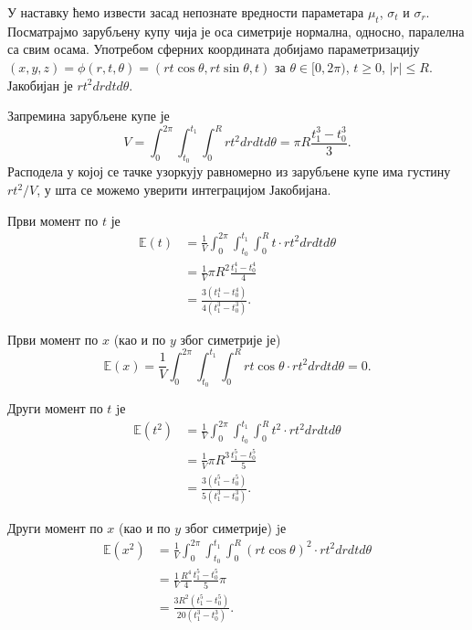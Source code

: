 \documentclass[12pt, a4paper, twoside]{book}
\numberwithin{equation}{chapter}
\numberwithin{theorem}{section}
\numberwithin{definition}{section}
\numberwithin{definitionChapter}{chapter}
\begin{document}
У наставку ћемо извести засад непознате вредности параметара $\mu_t$, $\sigma_t$ и $\sigma_r$.
Посматрајмо зарубљену купу чија је оса симетрије нормална, односно, паралелна са свим осама.
Употребом сферних координата добијамо параметризацију
$(x, y, z) = \phi(r, t, \theta) = (rt\cos\theta, rt\sin\theta, t)$ за $\theta \in [0, 2\pi)$,
$t\geq 0$, $|r| \leq R$. Јакобијан је $rt^2drdtd\theta$.

Запремина зарубљене купе је
\begin{equation}
	V = \int_{0}^{2\pi}\int_{t_0}^{t_1}\int_{0}^{R}rt^2drdtd\theta = \pi R \frac{t_1^3 - t_0^3}{3}.
\end{equation}
Расподела у којој се тачке узоркују равномерно из зарубљене купе има густину $rt^2/V$, у шта се можемо
уверити интеграцијом Јакобијана.

Први момент по $t$ је
\begin{equation}
	\begin{split}
		\mathbb{E}(t) & = \frac{1}{V}\int_{0}^{2\pi}\int_{t_0}^{t_1}\int_{0}^{R}t \cdot rt^2drdtd\theta \\
			& = \frac{1}{V}\pi R^2 \frac{t_1^4 - t_0^4}{4} \\
			& = \frac{3(t_1^4 - t_0^4)}{4(t_1^3 - t_0^3)}.
	\end{split}
\end{equation}

Први момент по $x$ (као и по $y$ због симетрије је)
\begin{equation}
	\mathbb{E}(x) = \frac{1}{V}\int_{0}^{2\pi}\int_{t_0}^{t_1}\int_{0}^{R}rt\cos\theta \cdot rt^2drdtd\theta = 0.
\end{equation}

Други момент по $t$ jе
\begin{equation}
	\begin{split}
		\mathbb{E}(t^2) & = \frac{1}{V}\int_{0}^{2\pi}\int_{t_0}^{t_1}\int_{0}^{R}t^2 \cdot rt^2drdtd\theta \\
			& = \frac{1}{V}\pi R^3\frac{t_1^5 - t_0^5}{5} \\
			& = \frac{3(t_1^5 - t_0^5)}{5(t_1^3 - t_0^3)}.
	\end{split}
\end{equation}

Други момент по $x$ (као и по $y$ због симетрије) jе
\begin{equation}
	\begin{split}
		\mathbb{E}(x^2) & = \frac{1}{V}\int_{0}^{2\pi}\int_{t_0}^{t_1}\int_{0}^{R}(rt\cos\theta)^2\cdot rt^2drdtd\theta \\
			& = \frac{1}{V}\frac{R^4}{4}\frac{t_1^5 - t_0^5}{5}\pi \\
			& = \frac{3R^2(t_1^5 - t_0^5)}{20(t_1^3 - t_0^3)}.
	\end{split}
\end{equation}
\end{document}

